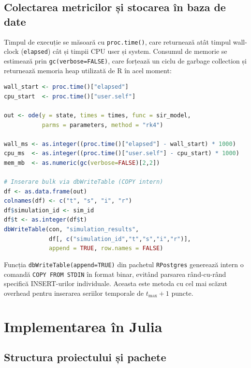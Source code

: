 \subsection{Colectarea metricilor și stocarea în baza de date}
\label{subsec:r_stocare}

Timpul de execuție se măsoară cu \texttt{proc.time()}, care returnează
atât timpul wall-clock (\texttt{elapsed}) cât și timpii CPU user și system.
Consumul de memorie se estimează prin \texttt{gc(verbose=FALSE)}, care
forțează un ciclu de garbage collection și returnează memoria heap utilizată
de R în acel moment:

\begin{lstlisting}[language=R, caption={Colectarea metricilor și inserarea bulk în YugabyteDB.}]
wall_start <- proc.time()["elapsed"]
cpu_start  <- proc.time()["user.self"]

out <- ode(y = state, times = times, func = sir_model,
           parms = parameters, method = "rk4")

wall_ms <- as.integer((proc.time()["elapsed"] - wall_start) * 1000)
cpu_ms  <- as.integer((proc.time()["user.self"] - cpu_start) * 1000)
mem_mb  <- as.numeric(gc(verbose=FALSE)[2,2])

# Inserare bulk via dbWriteTable (COPY intern)
df <- as.data.frame(out)
colnames(df) <- c("t", "s", "i", "r")
df$simulation_id <- sim_id
df$t <- as.integer(df$t)
dbWriteTable(con, "simulation_results",
             df[, c("simulation_id","t","s","i","r")],
             append = TRUE, row.names = FALSE)
\end{lstlisting}

Funcția \texttt{dbWriteTable(append=TRUE)} din pachetul \texttt{RPostgres}
generează intern o comandă \texttt{COPY FROM STDIN} în format binar, evitând
parsarea rând-cu-rând specifică INSERT-urilor individuale. Aceasta este
metoda cu cel mai scăzut overhead pentru inserarea seriilor temporale de
$t_{\max}+1$ puncte.

\section{Implementarea în Julia}
\label{sec:implementare_julia}

\subsection{Structura proiectului și pachete}
\label{subsec:julia_structura}

